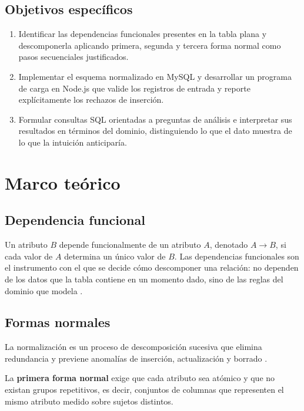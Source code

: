 \documentclass[conference]{IEEEtran}
\begin{document}
\subsection{Objetivos específicos}

\begin{enumerate}
\item Identificar las dependencias funcionales presentes en la tabla plana y
descomponerla aplicando primera, segunda y tercera forma normal como pasos
secuenciales justificados.

\item Implementar el esquema normalizado en MySQL y desarrollar un programa de
carga en Node.js que valide los registros de entrada y reporte explícitamente
los rechazos de inserción.

\item Formular consultas SQL orientadas a preguntas de análisis e interpretar
sus resultados en términos del dominio, distinguiendo lo que el dato muestra de
lo que la intuición anticiparía.
\end{enumerate}

\section{Marco teórico}

\subsection{Dependencia funcional}

Un atributo $B$ depende funcionalmente de un atributo $A$, denotado $A
\rightarrow B$, si cada valor de $A$ determina un único valor de $B$. Las
dependencias funcionales son el instrumento con el que se decide cómo
descomponer una relación: no dependen de los datos que la tabla contiene en un
momento dado, sino de las reglas del dominio que modela \cite{elmasri}.

\subsection{Formas normales}

La normalización es un proceso de descomposición sucesiva que elimina
redundancia y previene anomalías de inserción, actualización y borrado
\cite{date}.

La \textbf{primera forma normal} exige que cada atributo sea atómico y que no
existan grupos repetitivos, es decir, conjuntos de columnas que representen el
mismo atributo medido sobre sujetos distintos.
\end{document}

